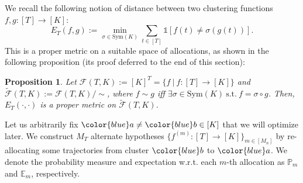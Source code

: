 \documentclass[twoside]{article}
\def\gF{{\mathcal{F}}}
\def\sP{{\mathbb{P}}}
\newcommand{\E}{\mathbb{E}}
\theoremstyle{plain}
\newtheorem{proposition}{Proposition}[section]
\newcommand{\indicator}{\mathds{1}}
\newcommand{\Sym}{\mathrm{Sym}}
\begin{document}
We recall the following notion of distance between two clustering functions $f, g : [T] \rightarrow [K]$:
\begin{equation}
    E_T(f, g) := \min_{\sigma \in \Sym(K)} \sum_{t \in [T]} \indicator[f(t) \neq \sigma(g(t))].
\end{equation}
This is a proper metric on a suitable space of allocations, as shown in the following proposition (its proof deferred to the end of this section):
\begin{proposition}
\label{prop:distance}
    Let $\gF(T, K) := [K]^T = \{ f \ | \ f : [T] \rightarrow [K] \}$ and $\widetilde{\gF}(T, K) := \gF(T, K) / \sim$, where $f \sim g$ iff $\exists \sigma \in \Sym(K) \ \text{s.t.} \ f = \sigma \circ g$.
    Then,
    $E_T(\cdot, \cdot)$ is a proper metric on $\widetilde{\gF}(T, K)$.
\end{proposition}

Let us arbitrarily fix ${\color{blue} a} \neq {\color{blue} b} \in [K]$ that we will optimize later.
We construct $M_T$ alternate hypotheses $\{ f^{(m)} : [T] \rightarrow [K] \}_{m \in [M_n]}$ by re-allocating some trajectories from cluster ${\color{blue} b}$ to ${\color{blue} a}$.
We denote the probability measure and expectation w.r.t. each $m$-th allocation as $\sP_m$ and $\E_m$, respectively.
\end{document}

